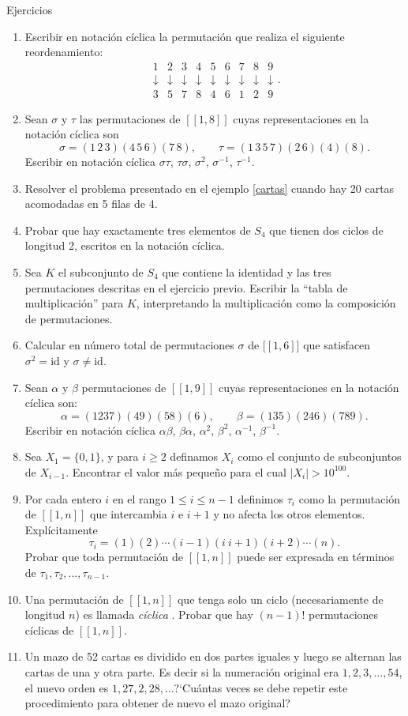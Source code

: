 \documentclass[11pt,spanish,makeidx]{amsbook}
\theoremstyle{definition}
\theoremstyle{remark}
\begin{document}
\begin{section}{Ejercicios}
\begin{enumerate}
\item Escribir en notación cíclica la permutación que realiza el siguiente reordenamiento:
$$
\begin{matrix} 1&2&3&4&5&6&7&8&9 \\
\downarrow&\downarrow&\downarrow&\downarrow&
\downarrow&\downarrow&\downarrow&\downarrow&\downarrow
\\ 3&5 &7 &8 &4 &6 &1 &2 &9
\end{matrix}.
$$
\item Sean $\sigma$ y $\tau$ las permutaciones de $[[1,8]]$ cuyas representaciones en la notación cíclica son
$$
\sigma= (1\,2\,3)(4\,5\,6)(7\,8),\qquad
\tau=(1\,3\,5\,7)(2\,6)(4)(8).
$$
Escribir en notación cíclica $\sigma\tau$, $\tau\sigma$, $\sigma^2$, $\sigma^{-1}$, $\tau^{-1}$. 
\item Resolver el problema presentado en el ejemplo \ref{cartas} cuando hay 20 cartas acomodadas en 5 filas de 4.
\item Probar que hay exactamente tres elementos de $S_4$ que tienen dos ciclos de longitud 2, escritos en la notación cíclica. 
\item Sea $K$ el subconjunto de $S_4$ que contiene la identidad y las tres permutaciones descritas en el ejercicio previo. Escribir la ``tabla de multiplicación'' para $K$, interpretando la multiplicación como la composición de permutaciones.
\item Calcular en número total de permutaciones $\sigma$ de $\mathbb [[1,6]]$ que satisfacen $\sigma^2=\text{id}$ y $\sigma\not=\text{id}$.
\item Sean $\alpha$ y $\beta$ permutaciones de $[[1,9]]$ cuyas representaciones en la notación cíclica son:
$$
\alpha= (1237)(49)(58)(6),\qquad \beta=(135)(246)(789).
$$
Escribir en notación cíclica $\alpha\beta$, $\beta\alpha$, $\alpha^2$, $\beta^2$, $\alpha^{-1}$, $\beta^{-1}$.
\item Sea $X_1=\{0,1\}$, y para $i\ge 2$ definamos $X_i$ como el conjunto de subconjuntos de $X_{i-1}$. Encontrar el valor más pequeño para el cual $|X_i|>10^{100}$.
\item Por cada entero $i$ en el rango $1 \le i \le n-1$ definimos $\tau_i$ como la permutación de $[[1,n]]$ que intercambia $i$ e $i+1$ y no afecta los otros elementos. Explícitamente 
$$
\tau_i = (1)(2)\cdots(i-1)(i\ i+1)(i+2)\cdots(n).
$$
Probar que toda permutación de $[[1,n]]$ puede ser expresada en términos de $\tau_1,\tau_2,\ldots,\tau_{n-1}$. 
\item Una permutación de $[[1,n]]$ que tenga solo un ciclo (necesariamente de longitud $n$) es llamada {\it cíclica}  . Probar que hay $(n-1)!$ permutaciones cíclicas de $[[1,n]]$.
\item Un mazo de 52 cartas es dividido en dos partes iguales y luego se alternan las cartas de una y otra parte. Es decir si la numeración original era $1,2,3,\ldots,54$, el nuevo orden es $1,27,2,28,\ldots$?`Cuántas veces se debe repetir este procedimiento para obtener de nuevo el mazo original? 
\end{enumerate}
\end{section}
\end{document}
